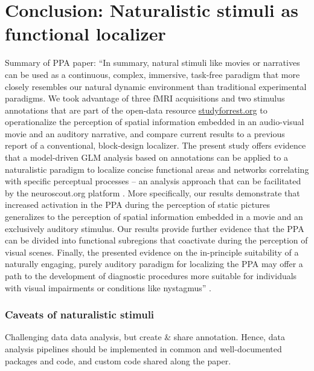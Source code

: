 \section{Conclusion: Naturalistic stimuli as functional localizer}

Summary of PPA paper:
``In summary, natural stimuli like movies \citep{eickhoff2020towards,
hasson2008neurocinematics, sonkusare2019naturalistic} or narratives
\citep{hamilton2018revolution, honey2012not, lerner2011topographic,
silbert2014coupled, wilson2008beyond} can be used as a continuous, complex,
immersive, task-free paradigm that more closely resembles our natural dynamic
environment than traditional experimental paradigms.
We took advantage of three fMRI acquisitions and two stimulus annotations that
are part of the open-data resource
\href{http://www.studyforrest.org}{studyforrest.org} to operationalize the
perception of spatial information embedded in an audio-visual movie and an
auditory narrative, and compare current results to a previous report of a
conventional, block-design localizer.
The present study offers evidence that a model-driven GLM analysis based on
annotations can be applied to a naturalistic paradigm to localize concise
functional areas and networks correlating with specific perceptual processes --
an analysis approach that can be facilitated by the neuroscout.org platform
\citep{delavega2021neuroscout}.
More specifically, our results demonstrate that increased activation in the PPA
during the perception of static pictures generalizes to the perception of
spatial information embedded in a movie and an exclusively auditory stimulus.
Our results provide further evidence that the PPA can be divided into functional
subregions that coactivate during the perception of visual scenes.
Finally, the presented evidence on the in-principle suitability of a naturally
engaging, purely auditory paradigm for localizing the PPA may offer a path to
the development of diagnostic procedures more suitable for individuals with
visual impairments or conditions like nystagmus''
\citep{haeusler2022processing}.



\subsubsection{Caveats of naturalistic stimuli}
%
Challenging data data analysis, but create \& share annotation.
%
Hence, data analysis pipelines should be implemented in common and
well-documented packages and code, and custom code shared along the paper.


